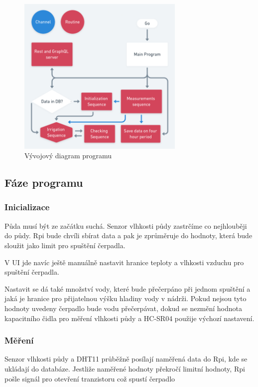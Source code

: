 \documentclass[11pt,a4paper]{article}
\begin{document}
\begin{figure}[h]
	\centering
	\includegraphics[width=8cm]{go.png}
	\caption*{Vývojový diagram programu}
\end{figure}

\subsection*{Fáze programu}

\subsubsection*{Inicializace}

Půda musí být ze začátku suchá. Senzor vlhkosti půdy zastrčíme co nejhlouběji do půdy. Rpi bude chvíli sbírat data a pak je zprůměruje do hodnoty, která bude sloužit jako limit pro spuštění čerpadla.

V UI jde navíc ještě manuálně nastavit hranice teploty a vlhkosti vzduchu pro spuštění čerpadla.

Nastavit se dá také množství vody, které bude přečerpáno při jednom spuštění a jaká je hranice pro přijatelnou výšku hladiny vody v nádrži. Pokud nejsou tyto hodnoty uvedeny čerpadlo bude vodu přečerpávat, dokud se nezmění hodnota kapacitního čidla pro měření vlhkosti půdy a HC-SR04 použije výchozí nastavení.

\subsubsection*{Měření}

Senzor vlhkosti půdy a DHT11 průběžně posílají naměřená data do Rpi, kde se ukládají do databáze. Jestliže naměřené hodnoty překročí limitní hodnoty, Rpi pošle signál pro otevření tranzistoru což spustí čerpadlo
\end{document}
